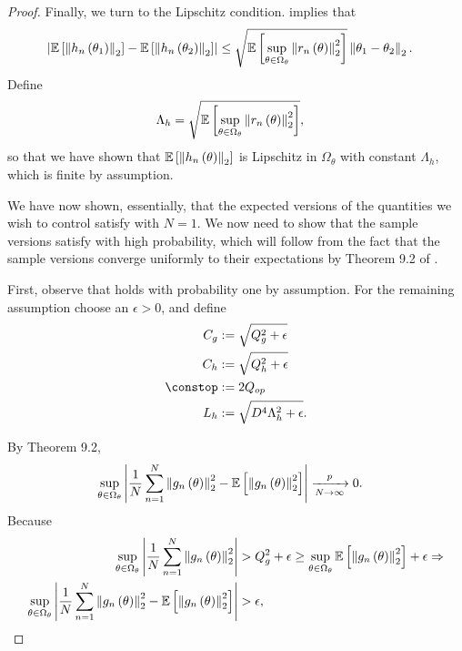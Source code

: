 \begin{proof}
Finally, we turn to the Lipschitz condition. 
implies that
\begin{align*}
\left|\mathbb{E}\left[\left\Vert h_{n}\left(\theta_{1}\right)\right\Vert_{2}\right]-\mathbb{E}\left[\left\Vert h_{n}\left(\theta_{2}\right)\right\Vert_{2}\right]\right| & \le\sqrt{\mathbb{E}\left[\sup_{\theta\in\Omega_{\theta}}\left\Vert r_{n}\left(\theta\right)\right\Vert_{2}^{2}\right]}\left\Vert \theta_{1}-\theta_{2}\right\Vert_{2}.
\end{align*}
Define
\begin{align*}
\Lambda_{h} & =\sqrt{\mathbb{E}\left[\sup_{\theta\in\Omega_{\theta}}\left\Vert r_{n}\left(\theta\right)\right\Vert_{2}^{2}\right]},
\end{align*}
so that we have shown that $\mathbb{E}\left[\left\Vert h_{n}\left(\theta\right)\right\Vert_{2}\right]$
is Lipschitz in $\Omega_{\theta}$ with constant $\Lambda_{h}$, which
is finite by assumption.

We have now shown, essentially, that the expected versions of the
quantities we wish to control satisfy \coreassum with $N=1$.
We now need to show that the sample versions satisfy \coreassum
with high probability, which will follow from the fact that the sample
versions converge uniformly to their expectations by
Theorem 9.2 of \citet{keener:2011:theoretical}.

First, observe that  holds with probability
one by assumption. For the remaining assumption choose an $\epsilon>0$,
and define
\begin{align*}
\constg & :=\sqrt{Q_{g}^{2}+\epsilon}\\
\consth & :=\sqrt{Q_{h}^{2}+\epsilon}\\
\constop & :=2Q_{op}\\
\liph & :=\sqrt{D^{4}\Lambda_{h}^{2}+\epsilon}.
\end{align*}

By \citet{keener:2011:theoretical} Theorem 9.2,
\begin{align*}
\sup_{\theta\in\Omega_{\theta}}\left|\frac{1}{N}\sum_{n=1}^{N}\left\Vert g_{n}\left(\theta\right)\right\Vert_{2}^{2}-\mathbb{E}\left[\left\Vert g_{n}\left(\theta\right)\right\Vert_{2}^{2}\right]\right| & \xrightarrow[N\rightarrow\infty]{p}0.
\end{align*}
Because
\begin{align*}
\sup_{\theta\in\Omega_{\theta}}\left|\frac{1}{N}\sum_{n=1}^{N}\left\Vert g_{n}\left(\theta\right)\right\Vert_{2}^{2}\right| & >Q_{g}^{2}+\epsilon\ge\sup_{\theta\in\Omega_{\theta}}\mathbb{E}\left[\left\Vert g_{n}\left(\theta\right)\right\Vert_{2}^{2}\right]+\epsilon\Rightarrow\\
\sup_{\theta\in\Omega_{\theta}}\left|\frac{1}{N}\sum_{n=1}^{N}\left\Vert g_{n}\left(\theta\right)\right\Vert_{2}^{2}-\mathbb{E}\left[\left\Vert g_{n}\left(\theta\right)\right\Vert_{2}^{2}\right]\right| & >\epsilon,
\end{align*}


\end{proof}
